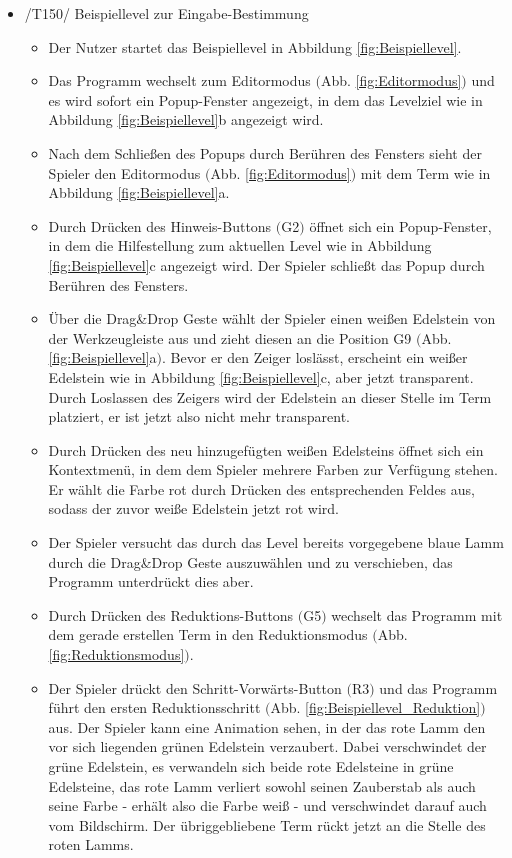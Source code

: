 \begin{itemize}
\item /T150/ Beispiellevel zur Eingabe-Bestimmung
\begin{itemize}
\item Der Nutzer startet das Beispiellevel in Abbildung \ref{fig:Beispiellevel}.
\item Das Programm wechselt zum Editormodus $($Abb. \ref{fig:Editormodus}$)$ und es wird sofort ein Popup-Fenster angezeigt, in dem das Levelziel wie in Abbildung \ref{fig:Beispiellevel}b angezeigt wird.
\item Nach dem Schließen des Popups durch Berühren des Fensters sieht der Spieler den Editormodus $($Abb. \ref{fig:Editormodus}$)$ mit dem Term wie in Abbildung \ref{fig:Beispiellevel}a.
\item Durch Drücken des Hinweis-Buttons $($G2$)$ öffnet sich ein Popup-Fenster, in dem die Hilfestellung zum aktuellen Level wie in Abbildung \ref{fig:Beispiellevel}c angezeigt wird. Der Spieler schließt das Popup durch Berühren des Fensters.
\item Über die Drag\&Drop Geste wählt der Spieler einen weißen Edelstein von der Werkzeugleiste aus und zieht diesen an die Position G9 $($Abb. \ref{fig:Beispiellevel}a$)$. Bevor er den Zeiger loslässt, erscheint ein weißer Edelstein wie in Abbildung \ref{fig:Beispiellevel}c, aber jetzt transparent. Durch Loslassen des Zeigers wird der Edelstein an dieser Stelle im Term platziert, er ist jetzt also nicht mehr transparent.
\item Durch Drücken des neu hinzugefügten weißen Edelsteins öffnet sich ein Kontextmenü, in dem dem Spieler mehrere Farben zur Verfügung stehen. Er wählt die Farbe rot durch Drücken des entsprechenden Feldes aus, sodass der zuvor weiße Edelstein jetzt rot wird.
\item Der Spieler versucht das durch das Level bereits vorgegebene blaue Lamm durch die Drag\&Drop Geste auszuwählen und zu verschieben, das Programm unterdrückt dies aber.
\item Durch Drücken des Reduktions-Buttons $($G5$)$ wechselt das Programm mit dem gerade erstellen Term in den Reduktionsmodus $($Abb. \ref{fig:Reduktionsmodus}$)$.
\item Der Spieler drückt den Schritt-Vorwärts-Button $($R3$)$ und das Programm führt den ersten Reduktionsschritt $($Abb. \ref{fig:Beispiellevel_Reduktion}$)$ aus. Der Spieler kann eine Animation sehen, in der das rote Lamm den vor sich liegenden grünen Edelstein verzaubert. Dabei verschwindet der grüne Edelstein, es verwandeln sich beide rote Edelsteine in grüne Edelsteine, das rote Lamm verliert sowohl seinen Zauberstab als auch seine Farbe - erhält also die Farbe weiß - und verschwindet darauf auch vom Bildschirm. Der übriggebliebene Term rückt jetzt an die Stelle des roten Lamms.

\end{itemize}
\end{itemize}
